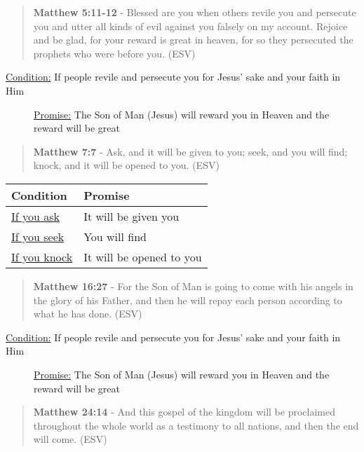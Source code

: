 \documentclass[11pt]{article}
\begin{document}
\begin{quote}
\textbf{Matthew 5:11-12} - Blessed are you when others revile you and persecute you and utter all kinds of evil against you falsely on my account. Rejoice and be glad, for your reward is great in heaven, for so they persecuted the prophets who were before you. (ESV)
\end{quote}

\begin{description}
\item[{\uline{Condition:} If people revile and persecute you for Jesus' sake and your faith in Him}] \uline{Promise:} The Son of Man (Jesus) will reward you in Heaven and the reward will be great
\end{description}

\begin{quote}
\textbf{Matthew 7:7} - Ask, and it will be given to you; seek, and you will find; knock, and it will be opened to you. (ESV)
\end{quote}

\begin{center}
\begin{tabular}{ll}
Condition & Promise\\[0pt]
\hline
\uline{If you ask} & It will be given you\\[0pt]
\uline{If you seek} & You will find\\[0pt]
\uline{If you knock} & It will be opened to you\\[0pt]
\end{tabular}
\end{center}

\begin{quote}
\textbf{Matthew 16:27} - For the Son of Man is going to come with his angels in the glory of his Father, and then he will repay each person according to what he has done. (ESV)
\end{quote}

\begin{description}
\item[{\uline{Condition:} If people revile and persecute you for Jesus' sake and your faith in Him}] \uline{Promise:} The Son of Man (Jesus) will reward you in Heaven and the reward will be great
\end{description}

\begin{quote}
\textbf{Matthew 24:14} - And this gospel of the kingdom will be proclaimed throughout the whole world as a testimony to all nations, and then the end will come. (ESV)
\end{quote}
\end{document}
